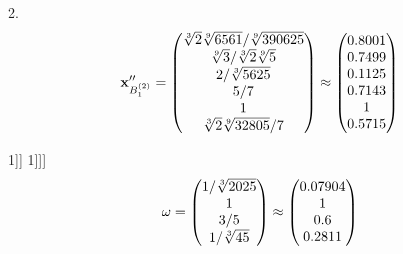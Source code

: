 \documentclass[10pt,a4paper]{article}
\begin{document}
	2.
	\[
		\bold{x}''_{B_1^{(2)}} = 
		\begin{pmatrix}
			{\sqrt[3]{2}\sqrt[9]{6561}} / {\sqrt[9]{390625}} \\
			{\sqrt[9]{3}} / {\sqrt[3]{2}\sqrt[9]{5}} \\
			{{2}} / {\sqrt[3]{5625}} \\
			{{5}} / {{7}} \\
			{1}{} \\
			{\sqrt[3]{2}\sqrt[9]{32805}} / {{7}} \\
		\end{pmatrix}
		\approx
		\begin{pmatrix}
			0.8001   \\
			0.7499   \\
			0.1125   \\
			0.7143   \\
			1        \\
			0.5715   \\
		\end{pmatrix}
	\]

1]]
	1]]]
	\[
		\bold{\omega} = 
		\begin{pmatrix}
			{1} / {\sqrt[3]{2025}} \\
			{1}{} \\
			{{3}} / {{5}} \\
			{1} / {\sqrt[3]{45}} \\
		\end{pmatrix}
		\approx
		\begin{pmatrix}
			0.07904  \\
			1        \\
			0.6      \\
			0.2811   \\
		\end{pmatrix}
	\]
\end{document}
